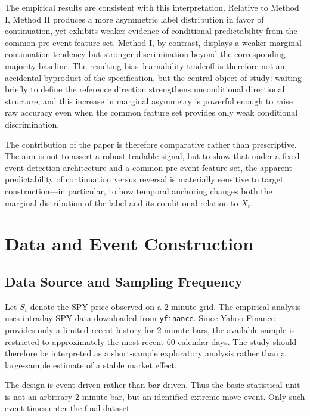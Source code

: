 \documentclass[11pt,a4paper]{article}
\begin{document}
	The empirical results are consistent with this interpretation. Relative to Method I, Method II produces a more asymmetric label distribution in favor of continuation, yet exhibits weaker evidence of conditional predictability from the common pre-event feature set. Method I, by contrast, displays a weaker marginal continuation tendency but stronger discrimination beyond the corresponding majority baseline. The resulting bias--learnability tradeoff is therefore not an accidental byproduct of the specification, but the central object of study: waiting briefly to define the reference direction strengthens unconditional directional structure, and this increase in marginal asymmetry is powerful enough to raise raw accuracy even when the common feature set provides only weak conditional discrimination.

	The contribution of the paper is therefore comparative rather than prescriptive. The aim is not to assert a robust tradable signal, but to show that under a fixed event-detection architecture and a common pre-event feature set, the apparent predictability of continuation versus reversal is materially sensitive to target construction---in particular, to how temporal anchoring changes both the marginal distribution of the label and its conditional relation to \(X_t\).


	
	\section{Data and Event Construction}

	\subsection{Data Source and Sampling Frequency}

	Let \(S_t\) denote the SPY price observed on a \(2\)-minute grid. The empirical analysis uses intraday SPY data downloaded from \texttt{yfinance}. Since Yahoo Finance provides only a limited recent history for \(2\)-minute bars, the available sample is restricted to approximately the most recent \(60\) calendar days. The study should therefore be interpreted as a short-sample exploratory analysis rather than a large-sample estimate of a stable market effect.

	The design is event-driven rather than bar-driven. Thus the basic statistical unit is not an arbitrary \(2\)-minute bar, but an identified extreme-move event. Only such event times enter the final dataset.
\end{document}

